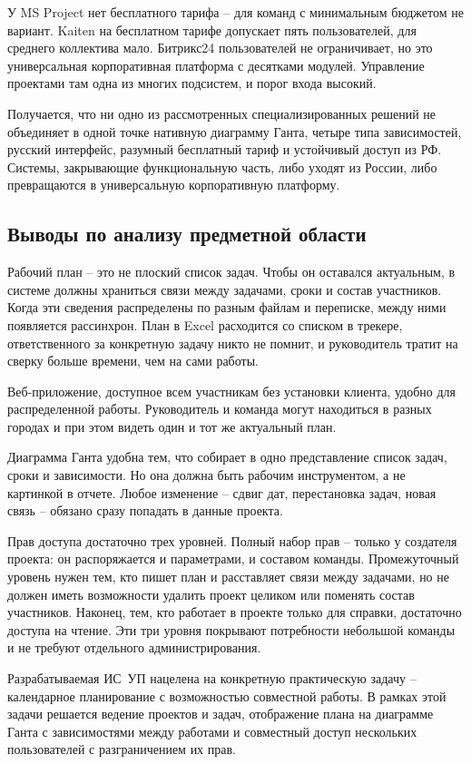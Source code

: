 У MS Project нет бесплатного тарифа -- для команд с минимальным бюджетом не вариант. Kaiten на бесплатном тарифе допускает пять пользователей, для среднего коллектива мало. Битрикс24 пользователей не ограничивает, но это универсальная корпоративная платформа с десятками модулей. Управление проектами там одна из многих подсистем, и порог входа высокий.

Получается, что ни одно из рассмотренных специализированных решений не объединяет в одной точке нативную диаграмму Ганта, четыре типа зависимостей, русский интерфейс, разумный бесплатный тариф и устойчивый доступ из РФ. Системы, закрывающие функциональную часть, либо уходят из России, либо превращаются в универсальную корпоративную платформу.

\subsection{Выводы по анализу предметной области}

Рабочий план -- это не плоский список задач. Чтобы он оставался актуальным, в системе должны храниться связи между задачами, сроки и состав участников. Когда эти сведения распределены по разным файлам и переписке, между ними появляется рассинхрон. План в Excel расходится со списком в трекере, ответственного за конкретную задачу никто не помнит, и руководитель тратит на сверку больше времени, чем на сами работы.

Веб-приложение, доступное всем участникам без установки клиента, удобно для распределенной работы. Руководитель и команда могут находиться в разных городах и при этом видеть один и тот же актуальный план.

Диаграмма Ганта удобна тем, что собирает в одно представление список задач, сроки и зависимости. Но она должна быть рабочим инструментом, а не картинкой в отчете. Любое изменение -- сдвиг дат, перестановка задач, новая связь -- обязано сразу попадать в данные проекта.

Прав доступа достаточно трех уровней. Полный набор прав -- только у создателя проекта: он распоряжается и параметрами, и составом команды. Промежуточный уровень нужен тем, кто пишет план и расставляет связи между задачами, но не должен иметь возможности удалить проект целиком или поменять состав участников. Наконец, тем, кто работает в проекте только для справки, достаточно доступа на чтение. Эти три уровня покрывают потребности небольшой команды и не требуют отдельного администрирования.

Разрабатываемая ИС~УП нацелена на конкретную практическую задачу -- календарное планирование с возможностью совместной работы. В рамках этой задачи решается ведение проектов и задач, отображение плана на диаграмме Ганта с зависимостями между работами и совместный доступ нескольких пользователей с разграничением их прав.
